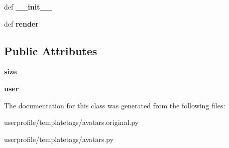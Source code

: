 \begin{DoxyCompactItemize}
\item 
\hypertarget{classsouvenir_1_1userprofile_1_1templatetags_1_1avatars_1_1ResizedThumbnailNode_a4d320ee900447a2d5dff33a849354d2d}{def {\bfseries \-\_\-\-\_\-init\-\_\-\-\_\-}}\label{classsouvenir_1_1userprofile_1_1templatetags_1_1avatars_1_1ResizedThumbnailNode_a4d320ee900447a2d5dff33a849354d2d}

\item 
\hypertarget{classsouvenir_1_1userprofile_1_1templatetags_1_1avatars_1_1ResizedThumbnailNode_a63823bc3df19f23f030b7456a247691c}{def {\bfseries render}}\label{classsouvenir_1_1userprofile_1_1templatetags_1_1avatars_1_1ResizedThumbnailNode_a63823bc3df19f23f030b7456a247691c}

\end{DoxyCompactItemize}
\subsection*{Public Attributes}
\begin{DoxyCompactItemize}
\item 
\hypertarget{classsouvenir_1_1userprofile_1_1templatetags_1_1avatars_1_1ResizedThumbnailNode_a332bde2a2e77d42325f2e6917ddccd2d}{{\bfseries size}}\label{classsouvenir_1_1userprofile_1_1templatetags_1_1avatars_1_1ResizedThumbnailNode_a332bde2a2e77d42325f2e6917ddccd2d}

\item 
\hypertarget{classsouvenir_1_1userprofile_1_1templatetags_1_1avatars_1_1ResizedThumbnailNode_ac68c93c8b137d715a81cfcf68ea04b92}{{\bfseries user}}\label{classsouvenir_1_1userprofile_1_1templatetags_1_1avatars_1_1ResizedThumbnailNode_ac68c93c8b137d715a81cfcf68ea04b92}

\end{DoxyCompactItemize}


The documentation for this class was generated from the following files\-:\begin{DoxyCompactItemize}
\item 
userprofile/templatetags/avatars.\-original.\-py\item 
userprofile/templatetags/avatars.\-py\end{DoxyCompactItemize}

